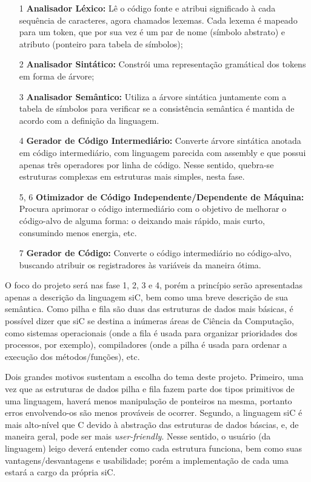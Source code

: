 \documentclass[12pt]{article}
\begin{document}
\begin{itemize}
	\item[1] \textbf{Analisador Léxico:} Lê o código fonte e atribui significado à cada sequência de caracteres, agora chamados lexemas. Cada lexema é mapeado para um token, que por sua vez é um par de nome (símbolo abstrato) e atributo (ponteiro para tabela de símbolos);
	\item[2] \textbf{Analisador Sintático:} Constrói uma representação gramátical dos tokens em forma de árvore;
	\item[3] \textbf{Analisador Semântico:} Utiliza a árvore sintática juntamente com a tabela de símbolos para verificar se a consistência semântica é mantida de acordo com a definição da linguagem.
	\item[4] \textbf{Gerador de Código Intermediário:} Converte árvore sintática anotada em código intermediário, com linguagem parecida com assembly e que possui apenas três operadores por linha de código. Nesse sentido, quebra-se estruturas complexas em estruturas mais simples, nesta fase.
	\item[5, 6] \textbf{Otimizador de Código Independente/Dependente de Máquina:} Procura aprimorar o código intermediário com o objetivo de melhorar o código-alvo de alguma forma: o deixando mais rápido, mais curto, consumindo menos energia, etc.
	\item[7] \textbf{Gerador de Código:} Converte o código intermediário no código-alvo, 	buscando atribuir os registradores às variáveis da maneira ótima.
\end{itemize}

\indent O foco do projeto será nas fase 1, 2, 3 e 4, porém a princípio serão apresentadas apenas a descrição da linguagem siC, bem como uma breve descrição de sua semântica. Como pilha e fila são duas das estruturas de dados mais básicas, é possível dizer que siC se destina a inúmeras áreas de Ciência da Computação, como sistemas operacionais (onde a fila é usada para organizar prioridades dos processos, por exemplo), compiladores (onde a pilha é usada para ordenar a execução dos métodos/funções), etc.

\indent Dois grandes motivos sustentam a escolha do tema deste projeto. Primeiro, uma vez que as estruturas de dados pilha e fila fazem parte dos tipos primitivos de uma linguagem, haverá menos manipulação de ponteiros na mesma, portanto erros envolvendo-os são menos prováveis de ocorrer. Segundo, a linguagem siC é mais alto-nível que C devido à abstração das estruturas de dados báscias, e, de maneira geral, pode ser mais \textit{user-friendly}. Nesse sentido, o usuário (da linguagem) leigo deverá entender como cada estrutura funciona, bem como suas vantagens/desvantagens e usabilidade; porém a implementação de cada uma estará a cargo da própria siC. 
\end{document}
